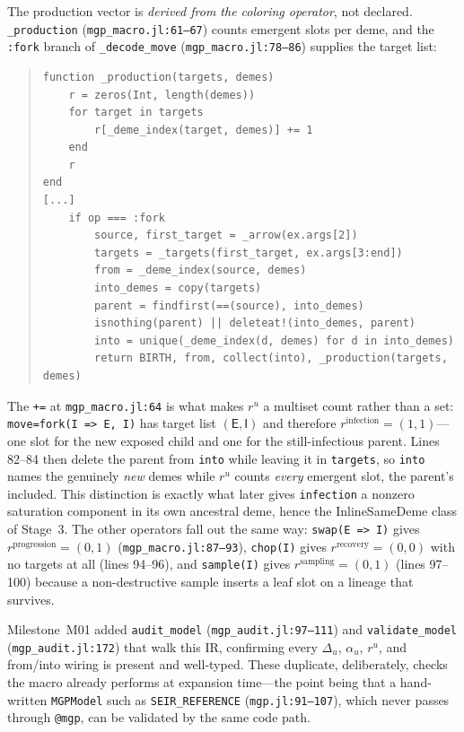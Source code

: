 \documentclass[11pt,leqno]{article}
\newcommand{\code}[1]{\texttt{#1}}
\newcommand{\deme}[1]{\mathsf{#1}}
\theoremstyle{plain}
\theoremstyle{definition}
\begin{document}
The production vector is \emph{derived from the coloring operator}, not
declared.  \code{\_production} (\code{mgp\_macro.jl:61--67}) counts emergent
slots per deme, and the \code{:fork} branch of \code{\_decode\_move}
(\code{mgp\_macro.jl:78--86}) supplies the target list:
\begin{quote}
{\small
\begin{verbatim}
function _production(targets, demes)
    r = zeros(Int, length(demes))
    for target in targets
        r[_deme_index(target, demes)] += 1
    end
    r
end
[...]
    if op === :fork
        source, first_target = _arrow(ex.args[2])
        targets = _targets(first_target, ex.args[3:end])
        from = _deme_index(source, demes)
        into_demes = copy(targets)
        parent = findfirst(==(source), into_demes)
        isnothing(parent) || deleteat!(into_demes, parent)
        into = unique(_deme_index(d, demes) for d in into_demes)
        return BIRTH, from, collect(into), _production(targets, demes)
\end{verbatim}
}
\end{quote}
The \code{+=} at \code{mgp\_macro.jl:64} is what makes $r^u$ a multiset count
rather than a set: \code{move=fork(I => E, I)} has target list
$(\deme{E},\deme{I})$ and therefore $r^{\text{infection}} = (1,1)$---one slot
for the new exposed child and one for the still-infectious parent.  Lines
82--84 then delete the parent from \code{into} while leaving it in
\code{targets}, so \code{into} names the genuinely \emph{new} demes while $r^u$
counts \emph{every} emergent slot, the parent's included.  This distinction is
exactly what later gives \code{infection} a nonzero saturation component in
its own ancestral deme, hence the InlineSameDeme class of Stage~3.  The other
operators fall out the same way: \code{swap(E => I)} gives
$r^{\text{progression}} = (0,1)$ (\code{mgp\_macro.jl:87--93}),
\code{chop(I)} gives $r^{\text{recovery}} = (0,0)$ with no targets at all
(lines 94--96), and \code{sample(I)} gives $r^{\text{sampling}} = (0,1)$
(lines 97--100) because a non-destructive sample inserts a leaf slot on a
lineage that survives.

Milestone~M01 added \code{audit\_model} (\code{mgp\_audit.jl:97--111}) and
\code{validate\_model} (\code{mgp\_audit.jl:172}) that walk this IR,
confirming every $\Delta_u$, $\alpha_u$, $r^u$, and from/into wiring is
present and well-typed.  These duplicate, deliberately, checks the macro
already performs at expansion time---the point being that a hand-written
\code{MGPModel} such as \code{SEIR\_REFERENCE} (\code{mgp.jl:91--107}), which
never passes through \code{@mgp}, can be validated by the same code path.
\end{document}
